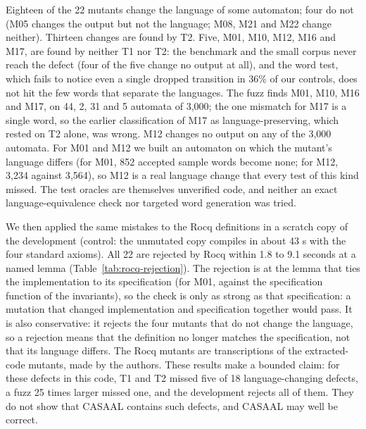 Eighteen of the 22 mutants change the language of some automaton; four do not (M05 changes the output but not the language; M08, M21 and M22 change neither). Thirteen changes are found by T2. Five, M01, M10, M12, M16 and M17, are found by neither T1 nor T2: the benchmark and the small corpus never reach the defect (four of the five change no output at all), and the word test, which fails to notice even a single dropped transition in 36\% of our controls, does not hit the few words that separate the languages. The fuzz finds M01, M10, M16 and M17, on 44, 2, 31 and 5 automata of 3{,}000; the one mismatch for M17 is a single word, so the earlier classification of M17 as language-preserving, which rested on T2 alone, was wrong. M12 changes no output on any of the 3{,}000 automata. For M01 and M12 we built an automaton on which the mutant's language differs (for M01, 852 accepted sample words become none; for M12, 3{,}234 against 3{,}564), so M12 is a real language change that every test of this kind missed. The test oracles are themselves unverified code, and neither an exact language-equivalence check nor targeted word generation was tried.

We then applied the same mistakes to the Rocq definitions in a scratch copy of the development (control: the unmutated copy compiles in about 43 s with the four standard axioms). All 22 are rejected by Rocq within 1.8 to 9.1 seconds at a named lemma (Table~\ref{tab:rocq-rejection}). The rejection is at the lemma that ties the implementation to its specification (for M01, against the specification function of the invariants), so the check is only as strong as that specification: a mutation that changed implementation and specification together would pass. It is also conservative: it rejects the four mutants that do not change the language, so a rejection means that the definition no longer matches the specification, not that its language differs. The Rocq mutants are transcriptions of the extracted-code mutants, made by the authors. These results make a bounded claim: for these defects in this code, T1 and T2 missed five of 18 language-changing defects, a fuzz 25 times larger missed one, and the development rejects all of them. They do not show that CASAAL contains such defects, and CASAAL may well be correct.


